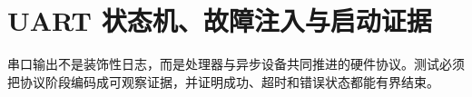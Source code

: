 \chapter{UART 状态机、故障注入与启动证据}

\begin{keyidea}
串口输出不是装饰性日志，而是处理器与异步设备共同推进的硬件协议。测试必须
把协议阶段编码成可观察证据，并证明成功、超时和错误状态都能有界结束。
\end{keyidea}





